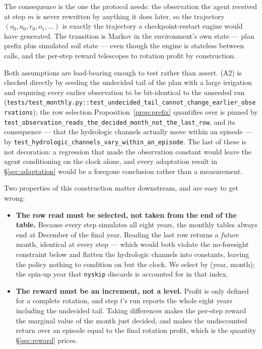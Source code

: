 \documentclass[a4paper,fleqn]{cas-sc}
\begin{document}
The consequence is the one the protocol needs: the observation the agent received at
step $m$ is never rewritten by anything it does later, so the trajectory
$(o_0, a_0, r_0, o_1, \ldots)$ is exactly the trajectory a checkpoint-restart engine
would have generated. The transition is Markov in the environment's own state --- plan
prefix plus simulated soil state --- even though the engine is stateless between calls,
and the per-step reward telescopes to rotation profit by construction.

Both assumptions are load-bearing enough to test rather than assert. (A2) is checked
directly by seeding the undecided tail of the plan with a large irrigation and requiring
every earlier observation to be bit-identical to the unseeded run
(\texttt{tests/test\_monthly.py::test\_undecided\_tail\_cannot\_change\_earlier\_observations});
the row selection Proposition~\ref{prop:prefix} quantifies over is pinned by
\texttt{test\_observation\_reads\_the\_decided\_month\_not\_the\_last\_row}, and its
consequence --- that the hydrologic channels actually move within an episode --- by
\texttt{test\_hydrologic\_channels\_vary\_within\_an\_episode}. The last of these is not
decoration: a regression that made the observation constant would leave the agent
conditioning on the clock alone, and every adaptation result in
\S\ref{sec:adaptation} would be a foregone conclusion rather than a measurement.

Two properties of this construction matter downstream, and are easy to get wrong:

\begin{itemize}
\item \textbf{The row read must be selected, not taken from the end of the table.}
Because every step simulates all eight years, the monthly tables always end at December
of the final year. Reading the last row returns a \emph{future} month, identical at every
step --- which would both violate the no-foresight constraint below and flatten the
hydrologic channels into constants, leaving the policy nothing to condition on but the
clock. We select by (year, month); the spin-up year that \texttt{nyskip} discards is
accounted for in that index.
\item \textbf{The reward must be an increment, not a level.} Profit is only defined for
a complete rotation, and step $t$'s run reports the whole eight years including the
undecided tail. Taking differences makes the per-step reward the marginal value of the
month just decided, and makes the undiscounted return over an episode equal to the final
rotation profit, which is the quantity \S\ref{sec:reward} prices.
\end{itemize}
\end{document}
